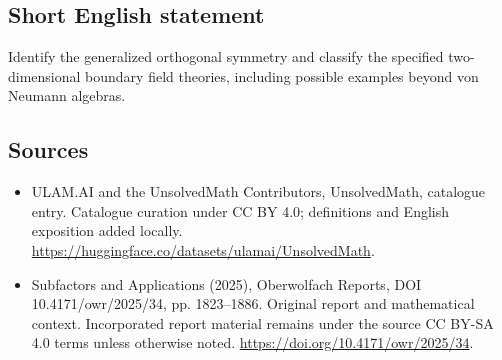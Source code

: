 \documentclass[11pt]{article}
\begin{document}
\subsection{Short English statement}
Identify the generalized orthogonal symmetry and classify the specified two-dimensional boundary field theories, including possible examples beyond von Neumann algebras.
\subsection{Sources}
\begin{itemize}
\item[\hypertarget{source:statement:1}{S1}] ULAM.AI and the UnsolvedMath Contributors, UnsolvedMath, catalogue entry. Catalogue curation under CC BY 4.0; definitions and English exposition added locally.
\url{https://huggingface.co/datasets/ulamai/UnsolvedMath}.
\item[\hypertarget{source:statement:2}{S2}] Subfactors and Applications (2025), Oberwolfach Reports, DOI 10.4171/owr/2025/34, pp. 1823--1886. Original report and mathematical context. Incorporated report material remains under the source CC BY-SA 4.0 terms unless otherwise noted.
\url{https://doi.org/10.4171/owr/2025/34}.
\end{itemize}
\label{end:statement}
\end{document}
